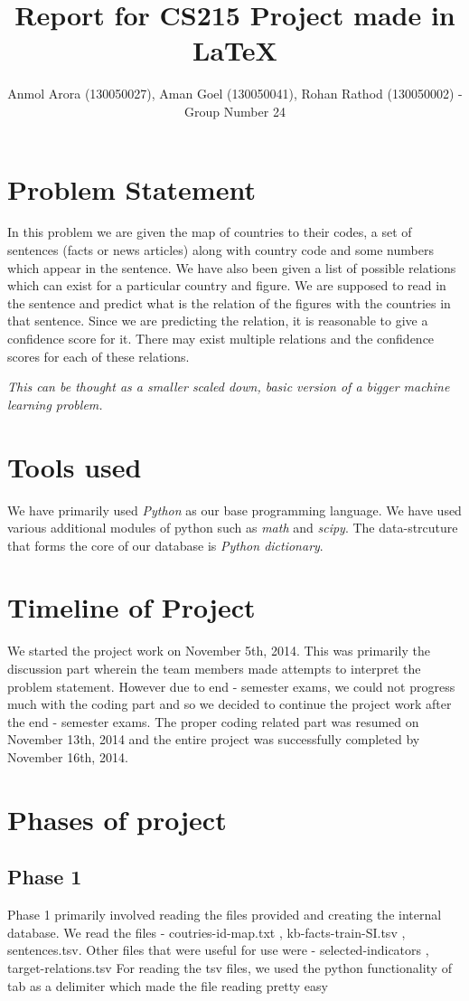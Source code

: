 \documentclass{pracjourn}
\title{Report for CS215 Project made in \LaTeX}
\author{Anmol Arora (130050027), Aman Goel (130050041), Rohan Rathod (130050002) - Group Number 24}
\begin{document}
\maketitle

\section{Problem Statement}
In this problem we are given the map of countries to their codes, 
a set of sentences (facts or news articles) along with country code and some numbers which appear in the sentence. 
We have also been given a list of possible relations which can exist for a particular country and figure.
We are supposed to read in the sentence and predict what is the relation of the figures with the countries in that sentence. 
Since we are predicting the relation, it is reasonable to give a confidence score for it. 
There may exist multiple relations and the confidence scores for each of these relations.

{\itshape This can be thought as a smaller scaled down, basic version of a bigger machine learning problem.}

\section{Tools used}
We have primarily used {\itshape Python} as our base programming language.
We have used various additional modules of python such as {\itshape math} and {\itshape scipy}.
The data-strcuture that forms the core of our database is {\itshape Python dictionary}.

\section{Timeline of Project}
We started the project work on November 5th, 2014.
This was primarily the discussion part wherein the team members made attempts to interpret the problem statement.
However due to end - semester exams, we could not progress much with the coding part and so we decided to continue the project work after the end - semester exams.
The proper coding related part was resumed on November 13th, 2014 and the entire project was successfully completed by November 16th, 2014.

\section{Phases of project}
\subsection{Phase 1}
Phase 1 primarily involved reading the files provided and creating the internal database.
We read the files - coutries-id-map.txt , kb-facts-train-SI.tsv , sentences.tsv.
Other files that were useful for use were - selected-indicators , target-relations.tsv
For reading the tsv files, we used the python functionality of tab as a delimiter which made the file reading pretty easy
\end{document}
